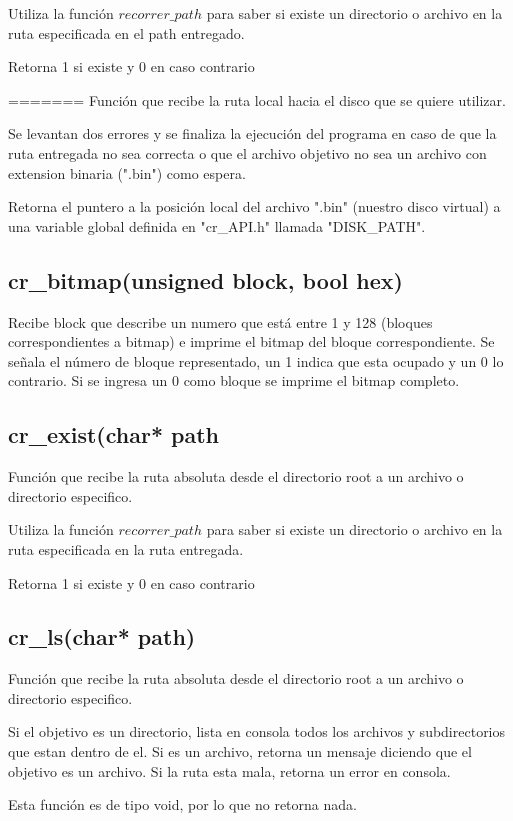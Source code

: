 \documentclass[12pt]{article}
\begin{document}
Utiliza la función $recorrer\_path$ para saber si existe un directorio o archivo en la ruta especificada en el path entregado.

Retorna 1 si existe y 0 en caso contrario

=======
Función que recibe la ruta local hacia el disco que se quiere utilizar. 

Se levantan dos errores y se finaliza la ejecución del programa en caso de que la ruta entregada no sea correcta o que el archivo objetivo no sea un archivo con extension binaria (".bin") como espera.

Retorna el puntero a la posición local del archivo ".bin" (nuestro disco virtual) a una variable global definida en "cr\_API.h" llamada "DISK\_PATH".

\subsection{cr\_bitmap(unsigned block, bool hex)}
Recibe block que describe un numero que está entre 1 y 128 (bloques correspondientes a bitmap) e imprime el bitmap del bloque correspondiente. Se señala el número de bloque representado, un 1 indica que esta ocupado y un 0 lo contrario. Si se ingresa un 0 como bloque se imprime el bitmap completo.


\subsection{cr\_exist(char* path}
Función que recibe la ruta absoluta desde el directorio root a un archivo o directorio especifico.

Utiliza la función $recorrer\_path$ para saber si existe un directorio o archivo en la ruta especificada en la ruta entregada.

Retorna 1 si existe y 0 en caso contrario

\subsection{cr\_ls(char* path)}
Función que recibe la ruta absoluta desde el directorio root a un archivo o directorio especifico.

Si el objetivo es un directorio, lista en consola todos los archivos y subdirectorios que estan dentro de el. Si es un archivo, retorna un mensaje diciendo que el objetivo es un archivo. Si la ruta esta mala, retorna un error en consola.

Esta función es de tipo void, por lo que no retorna nada.
\end{document}
